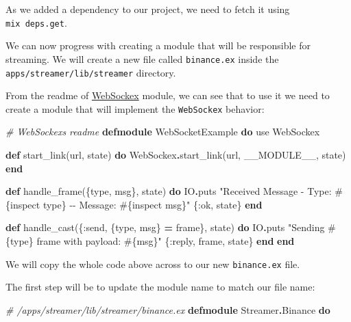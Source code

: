 \documentclass[
]{book}
\newenvironment{Shaded}{\begin{snugshade}}{\end{snugshade}}
\newcommand{\CommentTok}[1]{\textcolor[rgb]{0.56,0.35,0.01}{\textit{#1}}}
\newcommand{\ConstantTok}[1]{\textcolor[rgb]{0.00,0.00,0.00}{#1}}
\newcommand{\ImportTok}[1]{#1}
\newcommand{\KeywordTok}[1]{\textcolor[rgb]{0.13,0.29,0.53}{\textbf{#1}}}
\newcommand{\NormalTok}[1]{#1}
\newcommand{\OperatorTok}[1]{\textcolor[rgb]{0.81,0.36,0.00}{\textbf{#1}}}
\newcommand{\OtherTok}[1]{\textcolor[rgb]{0.56,0.35,0.01}{#1}}
\newcommand{\StringTok}[1]{\textcolor[rgb]{0.31,0.60,0.02}{#1}}
\newcommand{\VariableTok}[1]{\textcolor[rgb]{0.00,0.00,0.00}{#1}}
\begin{document}
As we added a dependency to our project, we need to fetch it using \texttt{mix\ deps.get}.

We can now progress with creating a module that will be responsible for streaming. We will create a new file called \texttt{binance.ex} inside the \texttt{apps/streamer/lib/streamer} directory.

From the readme of \href{https://github.com/Azolo/websockex}{WebSockex} module, we can see that to use it we need to create a module that will implement the \texttt{WebSockex} behavior:

\begin{Shaded}
\begin{Highlighting}[]
\CommentTok{\# WebSockex\textquotesingle{}s readme}
\KeywordTok{defmodule} \ConstantTok{WebSocketExample} \KeywordTok{do}
  \ImportTok{use} \ConstantTok{WebSockex}

  \KeywordTok{def}\NormalTok{ start\_link(url, state) }\KeywordTok{do}
    \ConstantTok{WebSockex}\OperatorTok{.}\NormalTok{start\_link(url, }\ConstantTok{\_\_MODULE\_\_}\NormalTok{, state)}
  \KeywordTok{end}

  \KeywordTok{def}\NormalTok{ handle\_frame(\{type, msg\}, state) }\KeywordTok{do}
    \ConstantTok{IO}\OperatorTok{.}\NormalTok{puts }\StringTok{"Received Message {-} Type: }\OtherTok{\#\{}\NormalTok{inspect type}\OtherTok{\}}\StringTok{ {-}{-} Message: }\OtherTok{\#\{}\NormalTok{inspect msg}\OtherTok{\}}\StringTok{"}
\NormalTok{    \{}\VariableTok{:ok}\NormalTok{, state\}}
  \KeywordTok{end}

  \KeywordTok{def}\NormalTok{ handle\_cast(\{}\VariableTok{:send}\NormalTok{, \{type, msg\} }\OperatorTok{=}\NormalTok{ frame\}, state) }\KeywordTok{do}
    \ConstantTok{IO}\OperatorTok{.}\NormalTok{puts }\StringTok{"Sending }\OtherTok{\#\{}\NormalTok{type}\OtherTok{\}}\StringTok{ frame with payload: }\OtherTok{\#\{}\NormalTok{msg}\OtherTok{\}}\StringTok{"}
\NormalTok{    \{}\VariableTok{:reply}\NormalTok{, frame, state\}}
  \KeywordTok{end}
\KeywordTok{end}
\end{Highlighting}
\end{Shaded}

We will copy the whole code above across to our new \texttt{binance.ex} file.

The first step will be to update the module name to match our file name:

\begin{Shaded}
\begin{Highlighting}[]
\CommentTok{\# /apps/streamer/lib/streamer/binance.ex}
\KeywordTok{defmodule} \ConstantTok{Streamer}\OperatorTok{.}\ConstantTok{Binance} \KeywordTok{do}
\end{Highlighting}
\end{Shaded}
\end{document}

